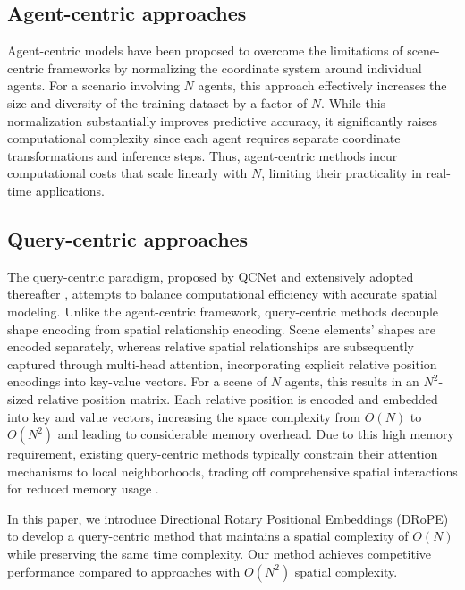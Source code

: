\documentclass[lettersize,journal]{IEEEtran}
\theoremstyle{definition}
\begin{document}
\subsection{Agent-centric approaches}

Agent-centric models \cite{feng2023macformer, 10803038} have been proposed to overcome the limitations of scene-centric frameworks by normalizing the coordinate system around individual agents. For a scenario involving \(N\) agents, this approach effectively increases the size and diversity of the training dataset by a factor of \(N\). While this normalization substantially improves predictive accuracy, it significantly raises computational complexity since each agent requires separate coordinate transformations and inference steps. Thus, agent-centric methods incur computational costs that scale linearly with \(N\), limiting their practicality in real-time applications.

\subsection{Query-centric approaches}

The query-centric paradigm, proposed by QCNet \cite{zhou2023query} and extensively adopted thereafter \cite{wu2024smart, zhou2023qcnext, zhou2024behaviorgpt}, attempts to balance computational efficiency with accurate spatial modeling. Unlike the agent-centric framework, query-centric methods decouple shape encoding from spatial relationship encoding. Scene elements' shapes are encoded separately, whereas relative spatial relationships are subsequently captured through multi-head attention, incorporating explicit relative position encodings into key-value vectors.
For a scene of $N$ agents, this results in an \(N^2\)-sized relative position matrix. Each relative position is encoded and embedded into key and value vectors, increasing the space complexity from \(O(N)\) to \(O(N^2)\) and leading to considerable memory overhead. Due to this high memory requirement, existing query-centric methods  typically constrain their attention mechanisms to local neighborhoods, trading off comprehensive spatial interactions for reduced memory usage \cite{wu2024smart, zhang2025closed}.


In this paper, we introduce Directional Rotary Positional Embeddings (DRoPE) to develop a query-centric method that maintains a spatial complexity of \(O(N)\) while preserving the same time complexity. Our method achieves competitive performance compared to approaches with \(O(N^2)\) spatial complexity.
\end{document}
